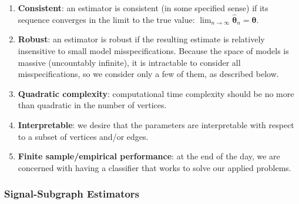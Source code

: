 \documentclass[10pt,journal,cspaper,compsoc]{IEEEtran}
\providecommand{\ve}[1]{\boldsymbol{#1}}
\newcommand{\bth}{\ve{\theta}}
\newcommand{\bhth}{\wh{\ve{\theta}}}
\providecommand{\mc}[1]{\mathcal{#1}}
\providecommand{\wh}[1]{\widehat{#1}}
\newcommand{\conv}{\rightarrow}
\begin{document}
\begin{enumerate}
	\item \textbf{Consistent}: an estimator is consistent (in some specified sense) if its sequence converges in the limit to the true value: $\lim_{n \conv \infty} \bhth_n = \bth$.  %
	\item \textbf{Robust}: an estimator is robust if the resulting estimate is relatively insensitive to small model misspecifications.  Because the space of models is massive (uncountably infinite), it is intractable to consider all misspecifications, so we consider only a few of them, as described below.
	\item \textbf{Quadratic complexity}: computational time complexity should be no more than quadratic in the number of vertices.
	\item \textbf{Interpretable}: we desire that the parameters are interpretable with respect to a subset of vertices and/or edges.
	\item \textbf{Finite sample/empirical performance}: at the end of the day, we are concerned with having a classifier that works to solve our applied problems.
\end{enumerate}


\subsubsection{Signal-Subgraph Estimators} %
\label{ssub:subsubsection_name1}
\end{document}
